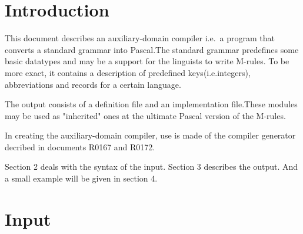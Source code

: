 

   
      \RosDate{\today}
      \RosSupersedes{-}
      \MakeRosTitle
\section{Introduction}
This document describes an auxiliary-domain compiler i.e.\ a program that
converts a standard grammar into Pascal.The standard grammar predefines
some basic datatypes and may be a support for the linguists to write M-rules.
To be more exact, it contains a description of predefined keys(i.e.integers),
abbreviations and records for a certain language.

The output consists of a definition file and an implementation file.These modules
may be used as "inherited" ones at the ultimate Pascal version of the
M-rules.

In creating the auxiliary-domain compiler, use is made of the compiler
generator decribed in documents R0167 and R0172.

Section 2 deals with the syntax of the input. Section 3 describes the output.
And a small example will be given in section 4.
\section{Input}
